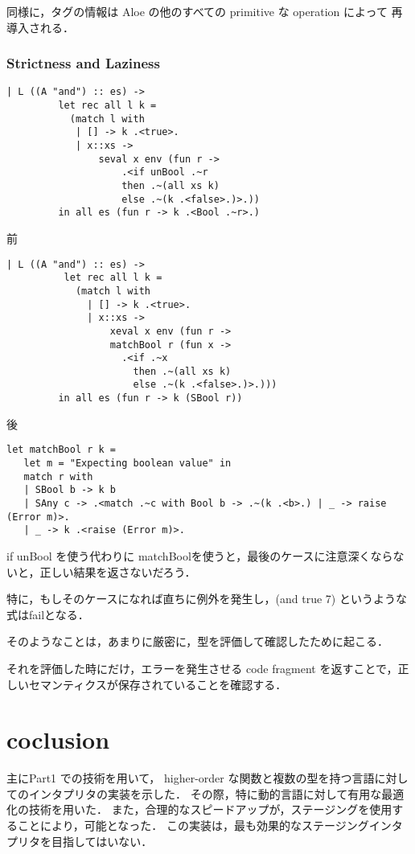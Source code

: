 \documentclass[10pt,a4paper]{jarticle}
\theoremstyle{definition}
\begin{document}

同様に，タグの情報は Aloe の他のすべての primitive な operation によって 再導入される．

\subsubsection{Strictness and Laziness}

{\small
\begin{verbatim}
| L ((A "and") :: es) ->
	     let rec all l k =
	       (match l with
	        | [] -> k .<true>.
	        | x::xs ->
		        seval x env (fun r ->
		            .<if unBool .~r
		            then .~(all xs k)
		            else .~(k .<false>.)>.))
	     in all es (fun r -> k .<Bool .~r>.)
\end{verbatim}}
前


{\small
\begin{verbatim}
| L ((A "and") :: es) ->
          let rec all l k =
            (match l with
              | [] -> k .<true>.
              | x::xs ->
                  xeval x env (fun r ->
                  matchBool r (fun x ->
                    .<if .~x
                      then .~(all xs k)
                      else .~(k .<false>.)>.)))
         in all es (fun r -> k (SBool r))
\end{verbatim}}
後

{\small
\begin{verbatim}
let matchBool r k =
   let m = "Expecting boolean value" in
   match r with
   | SBool b -> k b
   | SAny c -> .<match .~c with Bool b -> .~(k .<b>.) | _ -> raise (Error m)>.
   | _ -> k .<raise (Error m)>.
\end{verbatim}}


if unBool を使う代わりに matchBoolを使うと，最後のケースに注意深くならないと，正しい結果を返さないだろう．

特に，もしそのケースになれば直ちに例外を発生し，(and true 7) というような式はfailとなる．

そのようなことは，あまりに厳密に，型を評価して確認したために起こる．

それを評価した時にだけ，エラーを発生させる code fragment を返すことで，正しいセマンティクスが保存されていることを確認する．

\section{coclusion}
主にPart1 での技術を用いて，
higher-order な関数と複数の型を持つ言語に対してのインタプリタの実装を示した．
その際，特に動的言語に対して有用な最適化の技術を用いた．
また，合理的なスピードアップが，ステージングを使用することにより，可能となった．
この実装は，最も効果的なステージングインタプリタを目指してはいない．
\end{document}
